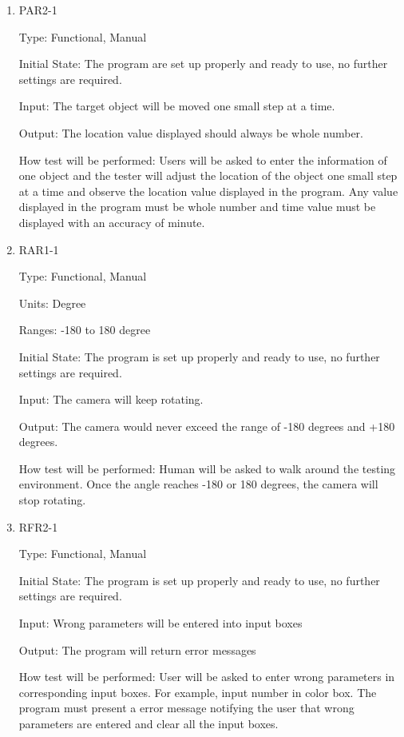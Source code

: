 \documentclass[12pt, titlepage]{article}
\begin{document}
\begin{enumerate}
\item{PAR2-1\\}

Type: Functional, Manual
					
Initial State: The program are set up properly and ready to use, no further settings are required.
					
Input: The target object will be moved one small step at a time.
					
Output: The location value displayed should always be whole number.
					
How test will be performed: Users will be asked to enter the information of one object and the tester will adjust the location of the object one small step at a time and observe the location value displayed in the program. Any value displayed in the program must be whole number and time value must be displayed with an accuracy of minute.


\item{RAR1-1\\}

Type: Functional, Manual

Units: Degree

Ranges: -180 to 180 degree
					
Initial State: The program is set up properly and ready to use, no further settings are required.
					
Input: The camera will keep rotating. 
					
Output: The camera would never exceed the range of -180 degrees and +180 degrees.
					
How test will be performed: Human will be asked to walk around the testing environment. Once the angle reaches -180 or 180 degrees, the camera will stop rotating.


\item{RFR2-1\\}

Type: Functional, Manual
					
Initial State: The program is set up properly and ready to use, no further settings are required.
					
Input: Wrong parameters will be entered into input boxes 
					
Output: The program will return error messages 
					
How test will be performed: User will be asked to enter wrong parameters in corresponding input boxes. For example, input number in color box. The program must present a error message notifying the user that wrong parameters are entered and clear all the input boxes.

\end{enumerate}
\end{document}
